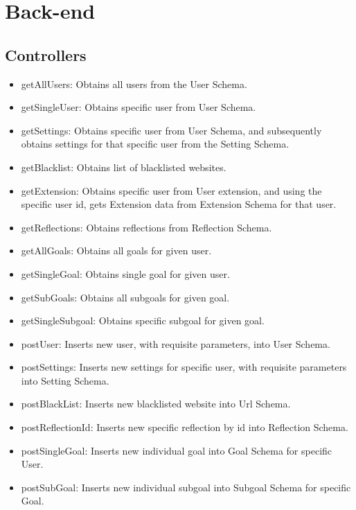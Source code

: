 \documentclass[letterpaper, 10 pt]{report}
\begin{document}
\section{Back-end}
\subsection{Controllers}
\begin{itemize}
 \item getAllUsers: Obtains all users from the User Schema.
 \item getSingleUser: Obtains specific user from User Schema.
 \item getSettings: Obtains specific user from User Schema, and subsequently obtains settings for that specific user from the Setting Schema.
 \item getBlacklist: Obtains list of blacklisted websites.
 \item getExtension: Obtains specific user from User extension, and using the specific user id, gets Extension data from Extension Schema for that user.
 \item getReflections: Obtains reflections from Reflection Schema.
 \item getAllGoals: Obtains all goals for given user.
 \item getSingleGoal: Obtains single goal for given user.
 \item getSubGoals: Obtains all subgoals for given goal.
 \item getSingleSubgoal: Obtains specific subgoal for given goal.
 
 \item postUser: Inserts new user, with requisite parameters, into User Schema.
 \item postSettings: Inserts new settings for specific user, with requisite parameters into Setting Schema.
 \item postBlackList: Inserts new blacklisted website into Url Schema.
 \item postReflectionId: Inserts new specific reflection by id into Reflection Schema.
 \item postSingleGoal: Inserts new individual goal into Goal Schema for specific User.
 \item postSubGoal: Inserts new individual subgoal into Subgoal Schema for specific Goal.
 

\end{itemize}
\end{document}
